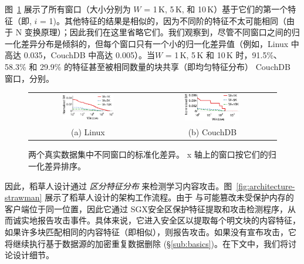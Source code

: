 图~\ref{fig:featureDistribution} 展示了所有窗口（大小分别为 $W$ = 1\,K, 5\,K, 和 10\,K）基于它们的第一个特征（即, $i$ = 1)。其他特征的结果是相似的，因为不同阶的特征不太可能相同（由于 N 变换原理）；因此我们在这里省略它们。我们观察到，尽管不同窗口之间的归一化差异分布是倾斜的，但每个窗口只有一个小的归一化差异值（例如，Linux 中高达 0.035，CouchDB 中高达 0.005）。当$W$ = 1\,K, 5\,K 和 10\,K 时，91.5\%、58.3\% 和 29.9\% 的特征甚至被相同数量的块共享（即均匀特征分布） CouchDB 窗口，分别。

\begin{figure}
  \centering
  \begin{tabular}{cc}
    \includegraphics[width=0.45\textwidth]{pic/featurespy/plot/featureDistribution/featureDistributionLinux.pdf} &
    \includegraphics[width=0.45\textwidth]{pic/featurespy/plot/featureDistribution/featureDistributionCouchbase.pdf} \\
    {\small (a) Linux} & {\small (b) CouchDB} \\
    \end{tabular}
  \vspace{-6pt}
  \caption{两个真实数据集中不同窗口的标准化差异。 x 轴上的窗口按它们的归一化差异排序。}
  \label{fig:featureDistribution}
  \vspace{-6pt}
\end{figure}

因此，稻草人设计通过 {\em 区分特征分布} 来检测学习内容攻击。图~\ref{fig:architecture-strawman} 展示了稻草人设计的架构工作流程。由于 \sysnameF 与可能篡改未受保护内存的客户端位于同一位置，因此它通过 SGX安全区保护特征提取和攻击检测程序，从而诚实地报告攻击事件。具体来说，它进入安全区以提取每个明文块的内容特征，如果许多块匹配相同的内容特征（即相似），则报告攻击。如果没有宣布攻击，它将继续执行基于数据源的加密重复数据删除 (\S\ref{sub:basics})。在下文中，我们将讨论设计细节。


